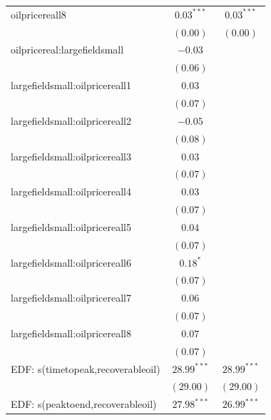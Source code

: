 \documentclass[12pt]{article}
\begin{document}
\begin{table}
\begin{center}
\begin{tabular}{l c c }
oilpricereall8                    & $0.03^{***}$     & $0.03^{***}$     \\
                                     & $(0.00)$         & $(0.00)$         \\
oilpricereal:largefieldsmall      & $-0.03$          &                  \\
                                     & $(0.06)$         &                  \\
largefieldsmall:oilpricereall1   & $0.03$           &                  \\
                                     & $(0.07)$         &                  \\
largefieldsmall:oilpricereall2   & $-0.05$          &                  \\
                                     & $(0.08)$         &                  \\
largefieldsmall:oilpricereall3   & $0.03$           &                  \\
                                     & $(0.07)$         &                  \\
largefieldsmall:oilpricereall4   & $0.03$           &                  \\
                                     & $(0.07)$         &                  \\
largefieldsmall:oilpricereall5   & $0.04$           &                  \\
                                     & $(0.07)$         &                  \\
largefieldsmall:oilpricereall6   & $0.18^{*}$       &                  \\
                                     & $(0.07)$         &                  \\
largefieldsmall:oilpricereall7   & $0.06$           &                  \\
                                     & $(0.07)$         &                  \\
largefieldsmall:oilpricereall8   & $0.07$           &                  \\
                                     & $(0.07)$         &                  \\
EDF: s(timetopeak,recoverableoil) & $28.99^{***}$    & $28.99^{***}$    \\
                                     & $(29.00)$        & $(29.00)$        \\
EDF: s(peaktoend,recoverableoil)  & $27.98^{***}$    & $26.99^{***}$    \\

\end{tabular}
\end{center}
\end{table}
\end{document}
